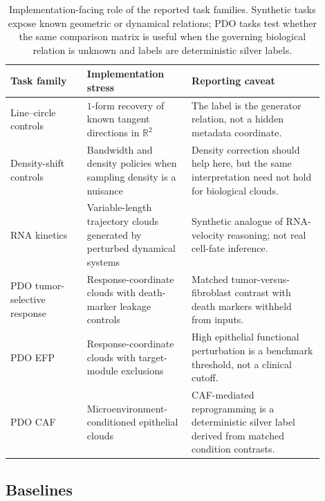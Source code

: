\documentclass{article}
\theoremstyle{remark}
\theoremstyle{plain}
\begin{document}
\begin{table}[H]
\caption{Implementation-facing role of the reported task families. Synthetic tasks expose known geometric or dynamical relations; PDO tasks test whether the same comparison matrix is useful when the governing biological relation is unknown and labels are deterministic silver labels.}
\label{tab:implementation-task-roles}
\centering
\small
\setlength{\tabcolsep}{4pt}
\renewcommand{\arraystretch}{1.12}
\begin{tabular}{p{0.22\linewidth}p{0.30\linewidth}p{0.38\linewidth}}
\toprule
Task family & Implementation stress & Reporting caveat \\
\midrule
Line--circle controls & \(1\)-form recovery of known tangent directions in \(\mathbb{R}^{2}\) & The label is the generator relation, not a hidden metadata coordinate. \\
Density-shift controls & Bandwidth and density policies when sampling density is a nuisance & Density correction should help here, but the same interpretation need not hold for biological clouds. \\
RNA kinetics & Variable-length trajectory clouds generated by perturbed dynamical systems & Synthetic analogue of RNA-velocity reasoning; not real cell-fate inference. \\
PDO tumor-selective response & Response-coordinate clouds with death-marker leakage controls\citep{kaufman2011leakage, kapoor2023leakage} & Matched tumor-versus-fibroblast contrast with death markers withheld from inputs. \\
PDO EFP & Response-coordinate clouds with target-module exclusions & High epithelial functional perturbation is a benchmark threshold, not a clinical cutoff. \\
PDO CAF & Microenvironment-conditioned epithelial clouds & CAF-mediated reprogramming is a deterministic silver label derived from matched condition contrasts. \\
\bottomrule
\end{tabular}
\end{table}

\subsection{Baselines}
\end{document}
